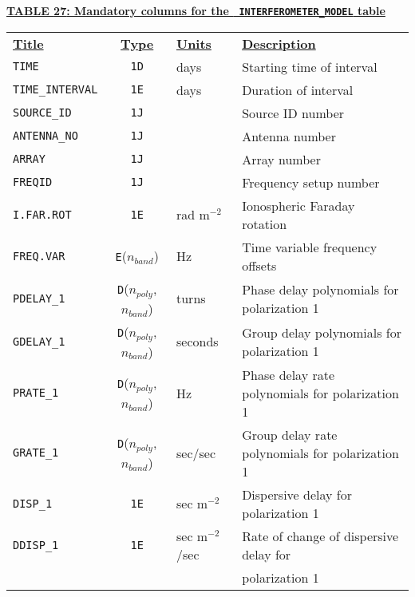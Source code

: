 \documentclass[twoside]{article}
\newcommand{\Hi}[1]{\textcolor{hicol}{#1}}
\newcommand{\Me}[1]{\textcolor{mecol}{#1}}
\newcommand{\nband}{$n_{band}$}
\newcommand{\npoly}{$n_{poly}$}
\begin{document}
\begin{center}
\underline{\bf{TABLE \Hi{27}: Mandatory columns for the {\tt
      INTERFEROMETER\_\Me{MODEL}} table}}\\
\begin{tabular}{lcll}
\noalign{\vspace{2pt}}
\underline{{\bf Title\vphantom{y}}} & \underline{\bf{Type}} &
   \underline{{\bf Units\vphantom{y}}} & \underline{\bf{Description}} \\
\noalign{\vspace{2pt}}
{\tt TIME}        & {\tt 1D} & days  & Starting time of interval \\
{\tt TIME\_INTERVAL} & {\tt 1E} & days & Duration of interval \\
{\tt SOURCE\_ID}  & {\tt 1J} &       & Source ID number \\
{\tt ANTENNA\_NO} & {\tt 1J} &       & Antenna number \\
{\tt ARRAY}       & {\tt 1J} &       & Array number \\
{\tt FREQID}      & {\tt 1J} &       & Frequency setup number \\
{\tt I.FAR.ROT}   & {\tt 1E} & rad m$^{-2}$ & Ionospheric Faraday
                                       rotation \\
{\tt FREQ.VAR}    & {\tt E}(\nband) & Hz & Time variable frequency
                                       offsets \\
{\tt PDELAY\_1}   & \Hi{{\tt D}}(\npoly,\nband) & turns & Phase delay
                                       polynomials for polarization 1 \\
{\tt GDELAY\_1}   & \Hi{{\tt D}}(\npoly,\nband) & seconds & Group delay
                                       polynomials for polarization 1 \\
{\tt PRATE\_1}    & \Hi{{\tt D}}(\npoly,\nband) & Hz & Phase delay rate
                                       polynomials for polarization 1 \\
{\tt GRATE\_1}    & \Hi{{\tt D}}(\npoly,\nband) & sec/sec & Group delay rate
                                       polynomials for polarization 1 \\
{\tt DISP\_1}     & {\tt 1E} & sec \Me{m$^{-2}$} & Dispersive delay for
                                       polarization 1 \\
{\tt DDISP\_1}    & {\tt 1E} & sec \Me{m$^{-2}$}/sec & Rate of change of dispersive
                                       delay for \\
                  &          &         & \hspace{1em} polarization 1 \\

\end{tabular}
\end{center}
\end{document}
